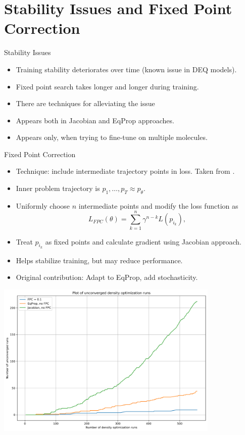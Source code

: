 \documentclass{beamer}
\begin{document}
\section{Stability Issues and Fixed Point Correction}
\begin{frame}{Stability Issues}
  \begin{itemize}
    \item Training stability deteriorates over time (known issue in DEQ models).
    \item Fixed point search takes longer and longer during training.
    \item There are techniques for alleviating the issue
    \item Appears both in Jacobian and EqProp approaches.
    \item Appears only, when trying to fine-tune on multiple molecules.
  \end{itemize}
\end{frame}

\begin{frame}{Fixed Point Correction}
  \begin{itemize}
    \item Technique: include intermediate trajectory points in loss. Taken from \cite{opticalflow}.
    \item Inner problem trajectory is $p_1, \ldots, p_T \approx p_\theta$.
    \item Uniformly choose $n$ intermediate points and modify the loss function as
    \[
      L_{FPC}(\theta) = \sum_{k=1}^{n} \gamma^{n-k} L(p_{i_k}),
    \]
    \item Treat $p_{i_k}$ as fixed points and calculate gradient using Jacobian approach.
    \item Helps stabilize training, but may reduce performance.
    \item Original contribution: Adapt to EqProp, add stochasticity.
  \end{itemize}

\end{frame}

\begin{frame}
   \begin{center}
    \includegraphics[width=0.8\textwidth]{images/stability_plot.png} %
  \end{center}
\end{frame}
\end{document}
